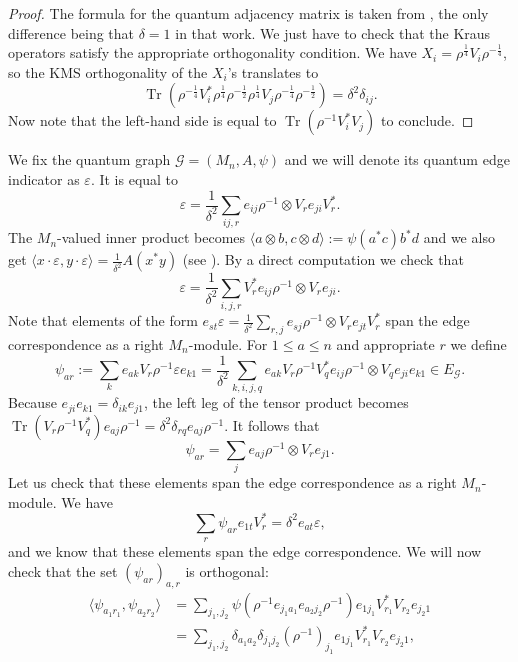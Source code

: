\documentclass[a4paper,reqno]{amsart}
\numberwithin{equation}{section}
\numberwithin{theorem}{section}
\theoremstyle{definition}\newtheorem{definition}[theorem]{Definition}
\theoremstyle{definition}\newtheorem{remark}[theorem]{Remark}
\theoremstyle{definition}\newtheorem{example}[theorem]{Example}
\theoremstyle{definition}\newtheorem*{notation*}{Notation}
\theoremstyle{definition}\newtheorem*{convention*}{Convention}
\theoremstyle{definition}\newtheorem{observation}{Observation}
\theoremstyle{definition}\newtheorem*{acknowledgment*}{Acknowledgments}
\newcommand{\G}{\mathcal{G}}
\renewcommand{\op}[1]{\operatorname{#1}}
\begin{document}
\begin{proof}
The formula for the quantum adjacency matrix is taken from \cite[Proposition 3.30]{Was}, the only difference being that $\delta=1$ in that work. We just have to check that the Kraus operators satisfy the appropriate orthogonality condition. We have $X_i = \rho^{\frac{1}{4}} V_i \rho^{-\frac{1}{4}}$, so the KMS orthogonality of the $X_i$'s translates to
\[
\op{Tr}(\rho^{-\frac{1}{4}} V_i^{\ast} \rho^{\frac{1}{4}} \rho^{-\frac{1}{2}} \rho^{\frac{1}{4}} V_j \rho^{-\frac{1}{4}} \rho^{-\frac{1}{2}}) = \delta^2 \delta_{ij}. 
\]
Now note that the left-hand side is equal to $\op{Tr}(\rho^{-1} V_{i}^{\ast} V_{j})$ to conclude.
\end{proof}

We fix the quantum graph $\mathcal{G}=(M_n, A,\psi)$ and we will denote its quantum edge indicator as $\varepsilon$. It is equal to
\[
\varepsilon = \frac{1}{\delta^2} \sum_{ij,r} e_{ij}\rho^{-1} \otimes V_{r} e_{ji} V_{r}^{\ast}.
\]
The $M_n$-valued inner product becomes $\langle a\otimes b, c\otimes d\rangle:= \psi(a^{\ast}c) b^{\ast}d$ and we also get $\langle x\cdot \varepsilon, y\cdot \varepsilon \rangle = \frac{1}{\delta^2} A(x^{\ast}y)$ (see \cite[Theorem 2.5 ]{BHINW}). By a direct computation we check that
\[
\varepsilon = \frac{1}{\delta^2} \sum_{i,j,r} V_{r}^{\ast} e_{ij} \rho^{-1} \otimes V_{r} e_{ji}.
\]
Note that elements of the form $e_{st}\varepsilon = \frac{1}{\delta^2} \sum_{r,j} e_{sj}\rho^{-1} \otimes V_{r} e_{jt} V_{r}^{\ast}$ span the edge correspondence as a right $M_n$-module. For $1\leq a\leq n$ and appropriate $r$ we define
\[
\psi_{ar}:= \sum_{k} e_{ak} V_{r} \rho^{-1} \varepsilon e_{k1} = \frac{1}{\delta^2}\sum_{k,i,j,q} e_{ak} V_{r} \rho^{-1} V_{q}^{\ast} e_{ij} \rho^{-1} \otimes V_{q} e_{ji}e_{k1} \in E_\G. 
\]
Because $e_{ji} e_{k1} = \delta_{ik} e_{j1}$, the left leg of the tensor product becomes $\op{Tr}(V_r \rho^{-1} V_{q}^{\ast}) e_{aj} \rho^{-1} = \delta^2 \delta_{rq} e_{aj} \rho^{-1}$. It follows that 
\[
\psi_{ar} = \sum_{j} e_{aj}\rho^{-1} \otimes V_{r} e_{j1}.
\]
Let us check that these elements span the edge correspondence as a right $M_n$-module. We have
\[
\sum_{r} \psi_{ar} e_{1t} V_{r}^{\ast} = \delta^2 e_{at} \varepsilon,
\]
and we know that these elements span the edge correspondence. We will now check that the set $(\psi_{ar})_{a,r}$ is orthogonal:
\begin{align*}
\langle \psi_{a_1 r_1}, \psi_{a_2 r_2}\rangle &= \sum_{j_1, j_2} \psi(\rho^{-1} e_{j_1 a_1} e_{a_2 j_2} \rho^{-1})e_{1j_1} V_{r_1}^{\ast} V_{r_2} e_{j_2 1} \\
&= \sum_{j_1, j_2} \delta_{a_1 a_2} \delta_{j_1 j_2} (\rho^{-1})_{j_1} e_{1j_1} V_{r_1}^{\ast} V_{r_2} e_{j_2 1}, 
\end{align*}
\end{document}
